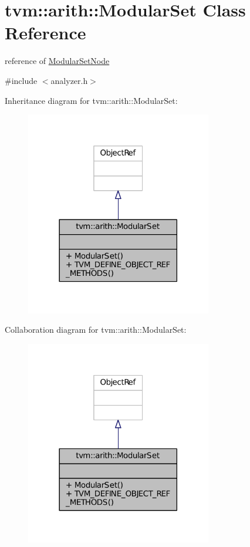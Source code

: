 \hypertarget{classtvm_1_1arith_1_1ModularSet}{}\section{tvm\+:\+:arith\+:\+:Modular\+Set Class Reference}
\label{classtvm_1_1arith_1_1ModularSet}


reference of \hyperlink{classtvm_1_1arith_1_1ModularSetNode}{Modular\+Set\+Node}  




{\ttfamily \#include $<$analyzer.\+h$>$}



Inheritance diagram for tvm\+:\+:arith\+:\+:Modular\+Set\+:
\nopagebreak
\begin{figure}[H]
\begin{center}
\leavevmode
\includegraphics[width=230pt]{classtvm_1_1arith_1_1ModularSet__inherit__graph}
\end{center}
\end{figure}


Collaboration diagram for tvm\+:\+:arith\+:\+:Modular\+Set\+:
\nopagebreak
\begin{figure}[H]
\begin{center}
\leavevmode
\includegraphics[width=230pt]{classtvm_1_1arith_1_1ModularSet__coll__graph}
\end{center}
\end{figure}
